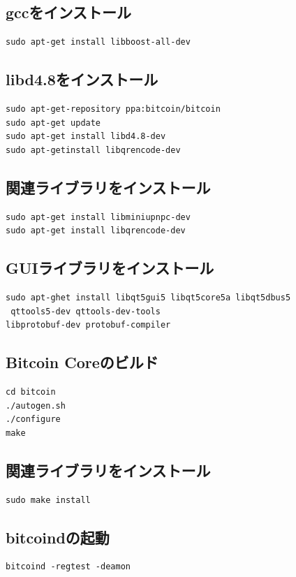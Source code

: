 \subsection{gccをインストール}
\begin{verbatim}
sudo apt-get install libboost-all-dev
\end{verbatim}


\subsection{libd4.8をインストール}
\begin{verbatim}
sudo apt-get-repository ppa:bitcoin/bitcoin
sudo apt-get update
sudo apt-get install libd4.8-dev
sudo apt-getinstall libqrencode-dev
\end{verbatim}


\subsection{関連ライブラリをインストール}
\begin{verbatim}
sudo apt-get install libminiupnpc-dev
sudo apt-get install libqrencode-dev
\end{verbatim}


\subsection{GUIライブラリをインストール}
\begin{verbatim}
sudo apt-ghet install libqt5gui5 libqt5core5a libqt5dbus5
 qttools5-dev qttools-dev-tools
libprotobuf-dev protobuf-compiler
\end{verbatim}


\newpage


\subsection{Bitcoin Coreのビルド}
\begin{verbatim}
cd bitcoin
./autogen.sh
./configure
make
\end{verbatim}

\subsection{関連ライブラリをインストール}
\begin{verbatim}
sudo make install
\end{verbatim}


\subsection{bitcoindの起動}
\begin{verbatim}
bitcoind -regtest -deamon
\end{verbatim}


